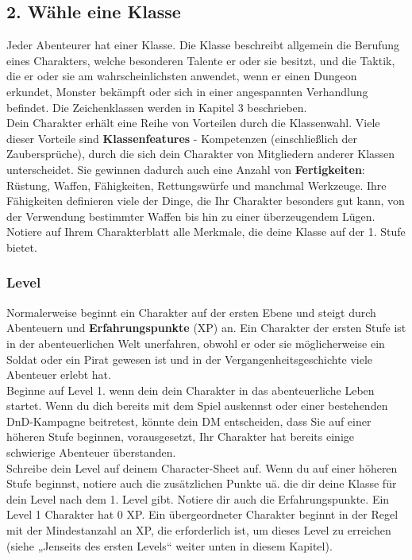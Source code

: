 \subsection{2. Wähle eine Klasse}
Jeder Abenteurer hat einer Klasse. Die Klasse beschreibt allgemein die Berufung eines Charakters, welche besonderen Talente er oder sie besitzt, und die Taktik, die er oder sie am wahrscheinlichsten anwendet, wenn er einen Dungeon erkundet, Monster bekämpft oder sich in einer angespannten Verhandlung befindet. Die Zeichenklassen werden in Kapitel 3 beschrieben.\\
Dein Charakter erhält eine Reihe von Vorteilen durch die Klassenwahl. Viele dieser Vorteile sind \textbf{Klassenfeatures} - Kompetenzen (einschließlich der Zaubersprüche), durch die sich dein Charakter von Mitgliedern anderer Klassen unterscheidet. Sie gewinnen dadurch auch eine Anzahl von \textbf{Fertigkeiten}: Rüstung, Waffen, Fähigkeiten, Rettungswürfe und manchmal Werkzeuge. Ihre Fähigkeiten definieren viele der Dinge, die Ihr Charakter besonders gut kann, von der Verwendung bestimmter Waffen bis hin zu einer überzeugendem Lügen.\\
Notiere auf Ihrem Charakterblatt alle Merkmale, die deine Klasse auf der 1. Stufe bietet.

\subsubsection{Level}
Normalerweise beginnt ein Charakter auf der ersten Ebene und steigt durch Abenteuern und \textbf{Erfahrungspunkte} (XP) an. Ein Charakter der ersten Stufe ist in der abenteuerlichen Welt unerfahren, obwohl er oder sie möglicherweise ein Soldat oder ein Pirat gewesen ist und in der Vergangenheitsgeschichte viele Abenteuer erlebt hat.\\
Beginne auf Level 1. wenn dein dein Charakter in das abenteuerliche Leben startet. Wenn du dich bereits mit dem Spiel auskennst oder einer bestehenden DnD-Kampagne beitretest, könnte dein DM entscheiden, dass Sie auf einer höheren Stufe beginnen, vorausgesetzt, Ihr Charakter hat bereits einige schwierige Abenteuer überstanden.\\
Schreibe dein Level auf deinem Character-Sheet auf. Wenn du auf einer höheren Stufe beginnst, notiere auch die zusätzlichen Punkte uä. die dir deine Klasse für dein Level nach dem 1. Level gibt. Notiere dir auch die Erfahrungspunkte. Ein Level 1 Charakter hat 0 XP. Ein übergeordneter Charakter beginnt in der Regel mit der Mindestanzahl an XP, die erforderlich ist, um dieses Level zu erreichen (siehe „Jenseits des ersten Levels“ weiter unten in diesem Kapitel).
